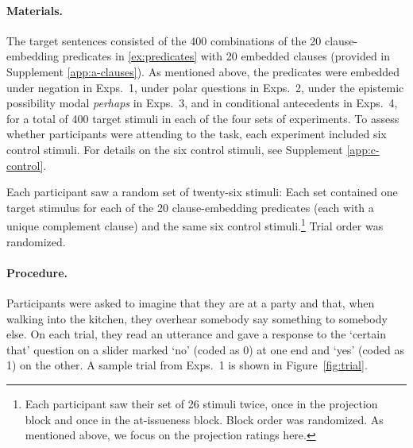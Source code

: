 \documentclass[a4paper,12pt,twoside]{article}
\begin{document}
        \paragraph{Materials.}
            The target sentences consisted of the 400 combinations of the 20 clause-em\-bed\-ding predicates in \ref{ex:predicates} with 20 embedded clauses (provided in Supplement \ref{app:a-clauses}). As mentioned above, the predicates were embedded under negation in Exps.~1, under polar questions in Exps.~2, under the epistemic possibility modal \emph{perhaps} in Exps.~3, and in conditional antecedents in Exps.~4, for a total of 400 target stimuli in each of the four sets of experiments. To assess whether participants were attending to the task, each experiment included six control stimuli. For details on the six control stimuli, see Supplement \ref{app:c-control}.

            Each participant saw a random set of twenty-six stimuli: Each set contained one target stimulus for each of the 20 clause-embedding predicates (each with a unique complement clause) and the same six control stimuli.\footnote{Each participant saw their set of 26 stimuli twice, once in the projection block and once in the at-issueness block. Block order was randomized. As mentioned above, we focus on the projection ratings here.} Trial order was randomized.
		
        \paragraph{Procedure.}
            Participants were asked to imagine that they are at a party and that, when walking into the kitchen, they overhear somebody say something to somebody else.
            On each trial, they read an utterance and gave a response to the `certain that' question on a slider marked `no' (coded as 0) at one end and `yes' (coded as 1) on the other. A sample trial from Exps.~1 is shown in Figure~\ref{fig:trial}. 
            
\end{document}
